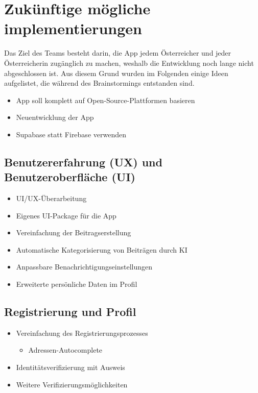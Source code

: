 \section{Zukünftige mögliche implementierungen}
Das Ziel des Teams besteht darin, die App jedem Österreicher und jeder Österreicherin zugänglich zu machen, weshalb die Entwicklung noch lange nicht abgeschlossen ist. Aus diesem Grund wurden im Folgenden einige Ideen aufgelistet, die während des Brainstormings entstanden sind.


\begin{itemize}
  \item App soll komplett auf Open-Source-Plattformen basieren
  \item Neuentwicklung der App
  \item Supabase statt Firebase verwenden
\end{itemize}

\subsection{Benutzererfahrung (UX) und Benutzeroberfläche (UI)}
\begin{itemize}
  \item UI/UX-Überarbeitung
  \item Eigenes UI-Package für die App
  \item Vereinfachung der Beitragserstellung
  \item Automatische Kategorisierung von Beiträgen durch KI
  \item Anpassbare Benachrichtigungseinstellungen
  \item Erweiterte persönliche Daten im Profil
\end{itemize}

\subsection{Registrierung und Profil}
\begin{itemize}
  \item Vereinfachung des Registrierungsprozesses
        \begin{itemize}
          \item Adressen-Autocomplete
        \end{itemize}
  \item Identitätsverifizierung mit Ausweis
  \item Weitere Verifizierungsmöglichkeiten
\end{itemize}

